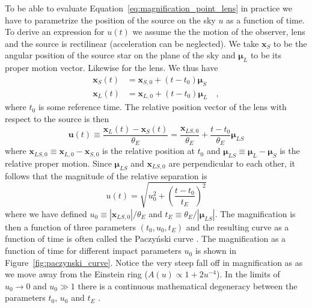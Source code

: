 \documentclass[12pt,dvipsnames]{report}
\renewcommand{\vec}[1]{\boldsymbol{\mathbf{#1}}}
\begin{document}
To be able to evaluate Equation~\ref{eq:magnification_point_lens} in practice
we have to parametrize the position of the source on the sky $u$ as a function
of time. To derive an expression for $u(t)$ we assume the the motion of the
observer, lens and the source is rectilinear (acceleration can be neglected).
We take $\vec{x}_S$ to be the angular position of the source star on the plane
of the sky and $\boldsymbol{\mu}_L$ to be its proper motion vector. Likewise
for the lens. We thus have
\begin{align}
    \vec{x}_S(t) & =\vec{x}_{S, 0}+
    \left(t-t_{0}\right) \boldsymbol{\mu}_S
    \label{eq:source_position}      \\
    \vec{x}_L(t) & =\vec{x}_{L, 0}
    +\left(t-t_{0}\right) \boldsymbol{\mu}_L\quad,
    \label{eq:lens_position}
\end{align}
where $t_0$ is some reference time.
The relative position vector of the lens with respect to the source is then
\begin{equation}
    \boldsymbol{u}(t) \equiv \frac{\vec{x}_L(t)
        -\vec{x}_S(t)}{\theta_E}=
    \frac{\vec{x}_{LS, 0}}{\theta_E}
    +\frac{t-t_{0}}{\theta_E} \boldsymbol{\mu}_{LS}
    \label{eq:relative_trajectory_no_parallax}
\end{equation}
where
$\vec{x}_{L S, 0}\equiv\vec{x}_{L,0}-\vec{x}_{S, 0}$
is the relative position at $t_0$ and
$\boldsymbol{\mu}_{LS}\equiv \boldsymbol{\mu}_{L}- \boldsymbol{\mu}_{S}$ is the
relative proper motion.
Since $\boldsymbol{\mu}_{LS}$ and $\vec{x}_{L S, 0}$ are
perpendicular to each other, it follows that the magnitude of the relative
separation is
\begin{equation}
    u(t)=\sqrt{u_0^2+ \left(\frac{t-t_0}{t_E}\right)^2}
\end{equation}
where we have defined $u_0\equiv |\vec{x}_{L S, 0}|/\theta_E$
and $t_E\equiv \theta_E/|\boldsymbol{\mu}_{LS}|$.
The magnification is then a function of three parameters $(t_0, u_0, t_E)$
and the resulting curve as a function of time is often called the Paczy\'nski curve
\citep{1986ApJ...304....1P,1986ApJ...301..503P}.
The magnification as a function of time for different impact parameters $u_0$
is shown in Figure~\ref{fig:paczynski_curve}. Notice the very steep fall off in
magnification as as we move away from the Einstein ring ($A(u)\propto
    1+2u^{-4}$).
In the limits of $u_0\rightarrow 0$ and $u_0\gg 1$  there is a continuous
mathematical degeneracy between the parameters $t_0$, $u_0$ and $t_E$
\citep{1997ApJ...487...55W}.
\end{document}

